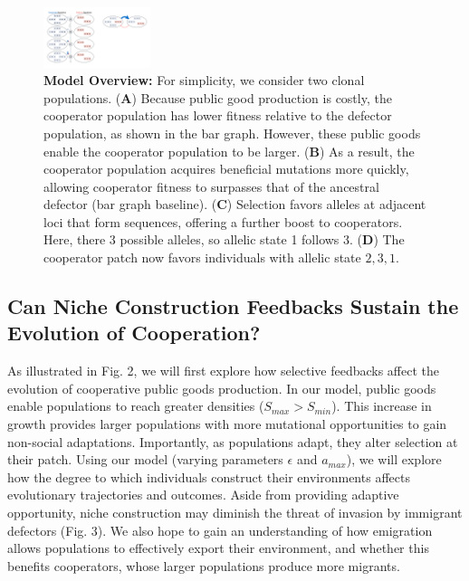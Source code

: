 \documentclass[10pt,]{article}
\begin{document}
\begin{figure}
    \centering
    \vspace{-1em}
    \includegraphics[width=0.279\textwidth]{figures/diagram1} 
    \caption{\textbf{Model Overview:} For simplicity, we consider two clonal
populations. (\textbf{A}) Because public good production is costly, the
cooperator population has lower fitness relative to the defector
population, as shown in the bar graph. However, these public goods enable
the cooperator population to be larger. (\textbf{B}) As a result, the
cooperator population acquires beneficial mutations more quickly,
allowing cooperator fitness to surpasses that of the ancestral defector
(bar graph baseline). (\textbf{C}) Selection favors alleles at adjacent
loci that form sequences, offering a further boost to cooperators. Here,
there 3 possible alleles, so allelic state 1 follows 3. (\textbf{D}) The
cooperator patch now favors individuals with allelic state \(2,3,1\).}
    \label{fig2}
\end{figure} 


\subsection{Can Niche Construction Feedbacks Sustain the Evolution of
Cooperation?}\label{can-niche-construction-feedbacks-sustain-the-evolution-of-cooperation}

As illustrated in Fig. 2, we will first explore how selective feedbacks affect
the evolution of cooperative public goods production. In our model, public
goods enable populations to reach greater densities (\(S_{max} > S_{min}\)).
This increase in growth provides larger populations with more mutational
opportunities to gain non-social adaptations. Importantly, as populations
adapt, they alter selection at their patch. Using our model (varying parameters
\(\epsilon\) and \(a_{max}\)), we will explore how the degree to which
individuals construct their environments affects evolutionary trajectories and
outcomes. Aside from providing adaptive opportunity, niche construction may
diminish the threat of invasion by immigrant defectors (Fig. 3). We also hope
to gain an understanding of how emigration allows populations to effectively
export their environment, and whether this benefits cooperators, whose larger
populations produce more migrants.
\end{document}
